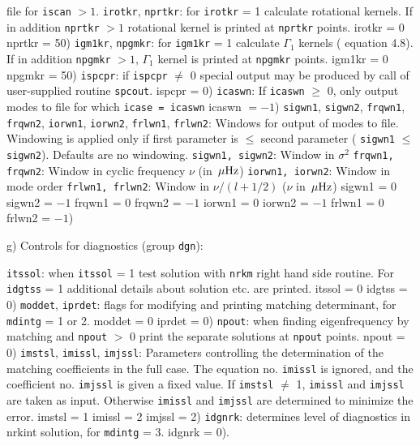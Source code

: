 file for {\tt iscan} $> 1$.
\param
{\tt irotkr}, {\tt nprtkr}: for {\tt irotkr} = 1 calculate rotational kernels.
If in addition {\tt nprtkr} $> 1$ rotational kernel is printed
at {\tt nprtkr} points.
{ irotkr = 0
nprtkr = 50})
\param
{\tt igm1kr}, {\tt npgmkr}: for {\tt igm1kr} = 1 calculate $\Gamma_1$ kernels
({\cf} equation 4.8).
If in addition {\tt npgmkr} $> 1$, $\Gamma_1$ kernel is printed
at {\tt npgmkr} points.
{ igm1kr = 0
npgmkr = 50})
\param
{\tt ispcpr}: if {\tt ispcpr} $\not=$ 0 special output may be produced by
call of user-supplied routine {\tt spcout}.
{ ispcpr = 0})
\param
{\tt icaswn}: If {\tt icaswn} $\ge$ 0, only output modes to file for which 
{\tt icase = icaswn}
{ icaswn $= -1$)}
\param 
{\tt sigwn1}, {\tt sigwn2}, {\tt frqwn1}, {\tt frqwn2}, {\tt iorwn1}, 
{\tt iorwn2}, {\tt frlwn1}, {\tt frlwn2}:
Windows for output of modes to file.
Windowing is applied only if first parameter is $\le$ second parameter
({\eg} {\tt sigwn1} $\le$ {\tt sigwn2}).
Defaults are no windowing.
\pparam
{\tt sigwn1, sigwn2}: Window in $\sigma^2$
\pparam
{\tt frqwn1, frqwn2}: Window in cyclic frequency $\nu$ (in $\,\mu{\rm Hz}$) 
\pparam
{\tt iorwn1, iorwn2}: Window in mode order
\pparam
{\tt frlwn1, frlwn2}: Window in $\nu/(l + 1/2)$ ($\nu$ in $\,\mu{\rm Hz}$)
{ sigwn1 = 0
sigwn2 = $-1$
frqwn1 = 0
frqwn2 = $-1$
iorwn1 = 0
iorwn2 = $-1$
frlwn1 = 0
frlwn2 = $-1$})

\subsect
g) Controls for diagnostics (group {\tt dgn}):

\param
{\tt itssol}: when {\tt itssol} = 1 test solution with 
{\tt nrkm} right hand side routine.
For {\tt idgtss} = 1 additional details about solution etc. are printed.
{ itssol = 0
idgtss = 0})
\param
{\tt moddet}, {\tt iprdet}: flags for modifying and printing 
matching determinant, for {\tt mdintg} = 1 or 2.
{ moddet = 0
iprdet = 0})
\param
{\tt npout}: when finding eigenfrequency by matching and {\tt npout} $>$ 0 
print the separate solutions at {\tt npout} points.
{ npout = 0})
\param
{\tt imstsl}, {\tt imissl}, {\tt imjssl}:
Parameters controlling the determination of the matching
coefficients in the full case.
The equation no. {\tt imissl} is ignored, and the coefficient no.
{\tt imjssl} is given a fixed value.
If {\tt imstsl} $\not=$ 1, {\tt imissl} and {\tt imjssl} are taken as input.
Otherwise {\tt imissl} and {\tt imjssl} are determined to minimize the error.
{ imstsl = 1
imissl = 2
imjssl = 2})
\param
{\tt idgnrk}: determines level of diagnostics in nrkint solution,
for {\tt mdintg} = 3.
{ idgnrk = 0}).

